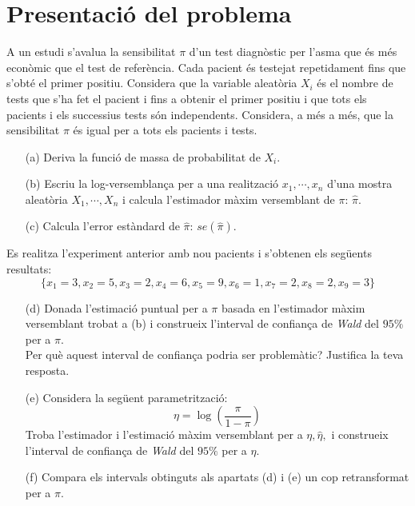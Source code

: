 \documentclass[12pt]{article}
\begin{document}
\section{Presentació del problema}
A un estudi s'avalua la sensibilitat $\pi$ d'un test diagnòstic per l'asma que és més econòmic
que el test de referència. Cada pacient és testejat repetidament fins que s'obté el primer
positiu. Considera que la variable aleatòria $X_i$ és el nombre de tests que s'ha fet el pacient i
fins a obtenir el primer positiu i que tots els pacients i els successius tests són independents.
Considera, a més a més, que la sensibilitat $\pi$ és igual per a tots els pacients i tests.
\begin{enumerate}
\item [(a)] Deriva la funció de massa de probabilitat de $X_i$.
\item [(b)] Escriu la log-versemblança per a una realització $x_1,\cdots,x_n$ d'una mostra aleatòria $X_1,\cdots,X_n$ i calcula l'estimador màxim versemblant de $\pi$: $\hat{\pi}$.
\item [(c)] Calcula l'error estàndard de $\hat{\pi}$: $se(\hat{\pi})$.
\end{enumerate}
Es realitza l'experiment anterior amb nou pacients i s'obtenen els següents resultats:
$$\{ x_1 = 3, x_2 = 5, x_3 = 2, x_4 = 6, x_5 = 9, x_6 = 1, x_7 = 2, x_8 = 2, x_9 = 3\}$$
\begin{enumerate}
\item [(d)] Donada l'estimació puntual per a $\pi$ basada en l'estimador màxim versemblant trobat a (b) i construeix l'interval de confiança de \textit{Wald} del $95\%$ per a $\pi$. \\Per què aquest interval de confiança podria ser problemàtic? Justifica la teva resposta.
\item [(e)] Considera la següent parametrització:
$$\eta = \log\left( \frac{\pi}{1-\pi}\right)$$
Troba l'estimador i l'estimació màxim versemblant per a $\eta, \hat{\eta},$ i construeix l'interval de confiança de \textit{Wald} del $95\%$ per a $\eta$.
\item [(f)] Compara els intervals obtinguts als apartats (d) i (e) un cop retransformat per a $\pi$.
\end{enumerate}
\newpage
\end{document}
